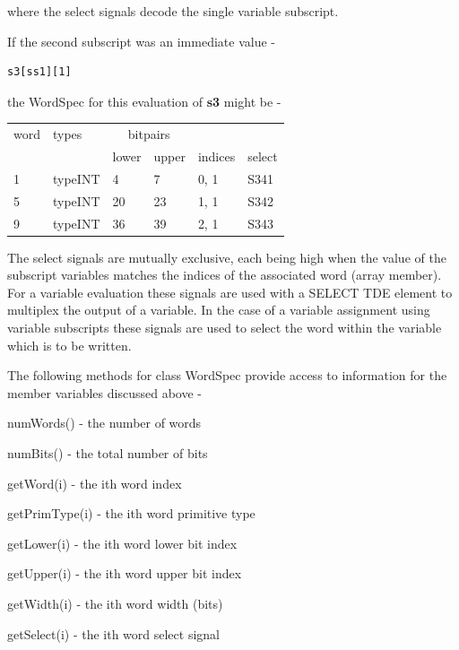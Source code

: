             where the select signals decode the single variable subscript.

            If the second subscript was an immediate value -
            \begin{lstlisting}[gobble=12, language=threepl]
                s3[ss1][1]
            \end{lstlisting}
            the WordSpec for this evaluation of {\bf s3} might be -

            \begin{tabular}{| l || l || l l | l | l |}
            \hline
            word  & types    & \multicolumn{2}{c|}{bitpairs} & & \\
                  &          & lower & upper & indices & select \\
            \hline \hline
             1    & typeINT  & 4     & 7     & 0, 1 & S341 \\ \hline
             5    & typeINT  & 20    & 23    & 1, 1 & S342 \\ \hline
             9    & typeINT  & 36    & 39    & 2, 1 & S343 \\ \hline
            \end{tabular}

            The select signals are mutually exclusive, each being high when the
            value of the subscript variables matches the indices of the associated
            word (array member). For a variable evaluation these signals are used
            with a SELECT TDE element to multiplex the output of a variable. In
            the case of a variable assignment using variable subscripts these
            signals are used to select the word within the variable which is to be
            written.

            The following methods for class WordSpec provide access
            to information for the member variables discussed above -
            \blist
            \item   numWords() - the number of words
            \item   numBits() - the total number of bits
            \item   getWord(i) - the ith word index
            \item   getPrimType(i) - the ith word primitive type
            \item   getLower(i) - the ith word lower bit index
            \item   getUpper(i) - the ith word upper bit index
            \item   getWidth(i) - the ith word width (bits)
            \item   getSelect(i) - the ith word select signal
            \blend

